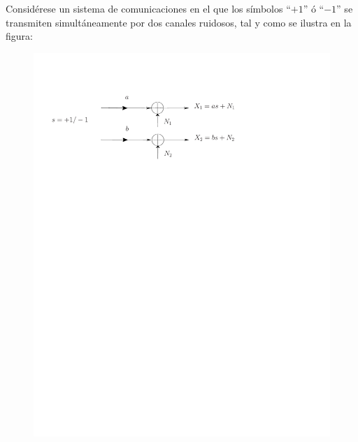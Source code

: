 \ifspanish

\question  Considérese un sistema de comunicaciones en el que los símbolos ``$+1$'' ó ``$-1$'' se transmiten simultáneamente por dos canales ruidosos, tal y como se ilustra en la figura:
\begin{figure}[h]
\begin{center}
\includegraphics[width=12cm, trim=0cm 20.5cm 4cm 2.5cm]{Figuras/canal_gauss}
\end{center}
\end{figure}


